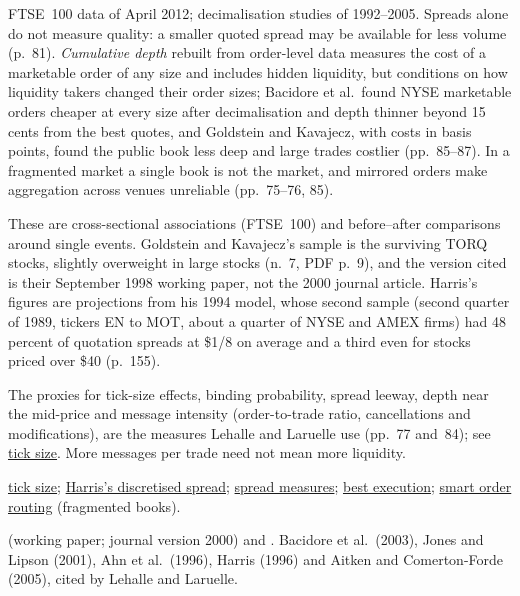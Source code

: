 \begin{qfevidence}
 FTSE~100 data of April 2012; decimalisation studies of 1992--2005. Spreads alone do not measure quality: a smaller quoted spread may be available for less volume (p.~81). \emph{Cumulative depth} rebuilt from order-level data measures the cost of a marketable order of any size and includes hidden liquidity, but conditions on how liquidity takers changed their order sizes; Bacidore et al.\ found NYSE marketable orders cheaper at every size after decimalisation and depth thinner beyond 15 cents from the best quotes, and Goldstein and Kavajecz, with costs in basis points, found the public book less deep and large trades costlier (pp.~85--87). In a fragmented market a single book is not the market, and mirrored orders make aggregation across venues unreliable (pp.~75--76, 85).

These are cross-sectional associations (FTSE~100) and before--after comparisons around single events. Goldstein and Kavajecz's sample is the surviving TORQ stocks, slightly overweight in large stocks (n.~7, PDF p.~9), and the version cited is their September 1998 working paper, not the 2000 journal article. Harris's figures are projections from his 1994 model, whose second sample (second quarter of 1989, tickers EN to MOT, about a quarter of NYSE and AMEX firms) had 48 percent of quotation spreads at \$1/8 on average and a third even for stocks priced over \$40 (p.~155).

 The proxies for tick-size effects, binding probability, spread leeway, depth near the mid-price and message intensity (order-to-trade ratio, cancellations and modifications), are the measures Lehalle and Laruelle use (pp.~77 and~84); see \hyperref[def:tick-size]{tick size}. More messages per trade need not mean more liquidity.

 \hyperref[def:tick-size]{tick size}; \hyperref[mod:harris-discretised-spread]{Harris's discretised spread}; \hyperref[def:spread-measures]{spread measures}; \hyperref[def:best-execution]{best execution}; \hyperref[def:smart-order-routing]{smart order routing} (fragmented books).

 \citep{goldstein-kavajecz-1998} (working paper; journal version 2000) and \citep{harris-1994}. Bacidore et al.\ (2003), Jones and Lipson (2001), Ahn et al.\ (1996), Harris (1996) and Aitken and Comerton-Forde (2005), cited by Lehalle and Laruelle.

\end{qfevidence}

